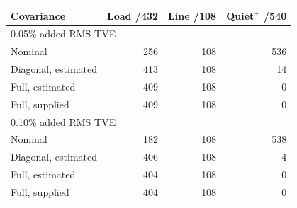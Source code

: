 \begin{tabular}{lrrr}\hline
Covariance & Load /432 & Line /108 & Quiet$^+$ /540\\\hline
\multicolumn{4}{l}{0.05\% added RMS TVE}\\
Nominal & 256 & 108 & 536\\
Diagonal, estimated & 413 & 108 & 14\\
Full, estimated & 409 & 108 & 0\\
Full, supplied & 409 & 108 & 0\\
\multicolumn{4}{l}{0.10\% added RMS TVE}\\
Nominal & 182 & 108 & 538\\
Diagonal, estimated & 406 & 108 & 4\\
Full, estimated & 404 & 108 & 0\\
Full, supplied & 404 & 108 & 0\\
\hline\end{tabular}
